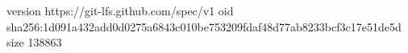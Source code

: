 version https://git-lfs.github.com/spec/v1
oid sha256:1d091a432add0d0275a6843c010be753209fdaf48d77ab8233bcf3c17e51de5d
size 138863
